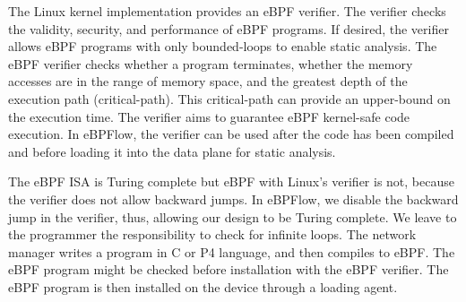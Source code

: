 The Linux kernel implementation provides an eBPF verifier.
The verifier checks the validity, security, and performance of eBPF programs.
If desired, the verifier allows eBPF programs with only bounded-loops to enable static analysis.
The eBPF verifier checks whether a program terminates, whether the memory accesses are in the range of memory space, and the greatest depth of the execution path (critical-path).
This critical-path can provide an upper-bound on the execution time.
The verifier aims to guarantee eBPF kernel-safe code execution.
In eBPFlow, the verifier can be used after the code has been compiled and before loading it into the data plane for static analysis.

The eBPF ISA is Turing complete but eBPF with Linux's verifier is not, because the verifier does not allow backward jumps.
In eBPFlow, we disable the backward jump in the verifier, thus, allowing our design to be Turing complete. We leave to the programmer the responsibility to check for infinite loops. The network manager writes a program in C or P4 language, and then compiles to eBPF. The eBPF program might be checked before installation with the eBPF verifier. The eBPF program is then installed on the device through a loading agent.





